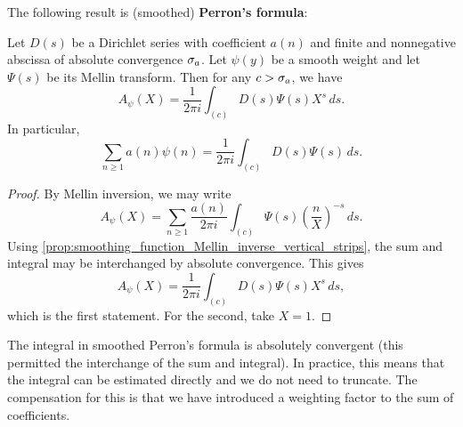     The following result is (smoothed) \textbf{Perron's formula}:

    \begin{theorem*}
      Let \(D(s)\) be a Dirichlet series with coefficient \(a(n)\) and finite and nonnegative abscissa of absolute convergence \(\sigma_{a}\). Let \(\psi(y)\) be a smooth weight and let \(\Psi(s)\) be its Mellin transform. Then for any \(c > \sigma_{a}\), we have
      \[
        A_{\psi}(X) = \frac{1}{2\pi i}\int_{(c)}D(s)\Psi(s)X^{s}\,ds.
      \]
      In particular,
      \[
        \sum_{n \ge 1}a(n)\psi(n) = \frac{1}{2\pi i}\int_{(c)}D(s)\Psi(s)\,ds.
      \]
    \end{theorem*}
    \begin{proof}
      By Mellin inversion, we may write
      \[
        A_{\psi}(X) = \sum_{n \ge 1}\frac{a(n)}{2\pi i}\int_{(c)}\Psi(s)\left(\frac{n}{X}\right)^{-s}\,ds.
      \]
      Using \cref{prop:smoothing_function_Mellin_inverse_vertical_strips}, the sum and integral may be interchanged by absolute convergence. This gives
      \[
        A_{\psi}(X) = \frac{1}{2\pi i}\int_{(c)}D(s)\Psi(s)X^{s}\,ds,
      \]
      which is the first statement. For the second, take \(X = 1\).
    \end{proof}

    The integral in smoothed Perron's formula is absolutely convergent (this permitted the interchange of the sum and integral). In practice, this means that the integral can be estimated directly and we do not need to truncate. The compensation for this is that we have introduced a weighting factor to the sum of coefficients.
